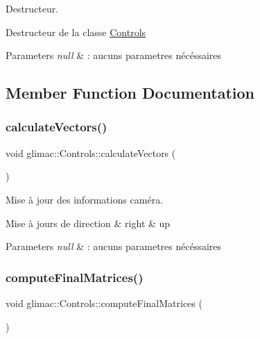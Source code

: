 Destructeur. 

Destructeur de la classe \hyperlink{classglimac_1_1Controls}{Controls}


\begin{DoxyParams}{Parameters}
{\em null} & \+: aucuns parametres nécéssaires \\
\hline
\end{DoxyParams}


\subsection{Member Function Documentation}
\mbox{\label{classglimac_1_1Controls_a1937e9b03344764ec2bb608cf5d42f20}} 
\subsubsection{\texorpdfstring{calculate\+Vectors()}{calculateVectors()}}
{\footnotesize\ttfamily void glimac\+::\+Controls\+::calculate\+Vectors (\begin{DoxyParamCaption}{ }\end{DoxyParamCaption})}



Mise à jour des informations caméra. 

Mise à jours de direction \& right \& up


\begin{DoxyParams}{Parameters}
{\em null} & \+: aucuns parametres nécéssaires \\
\hline
\end{DoxyParams}
\mbox{\label{classglimac_1_1Controls_a03104d031d93fdb96ab945d385ecdca0}} 
\subsubsection{\texorpdfstring{compute\+Final\+Matrices()}{computeFinalMatrices()}}
{\footnotesize\ttfamily void glimac\+::\+Controls\+::compute\+Final\+Matrices (\begin{DoxyParamCaption}{ }\end{DoxyParamCaption})}



